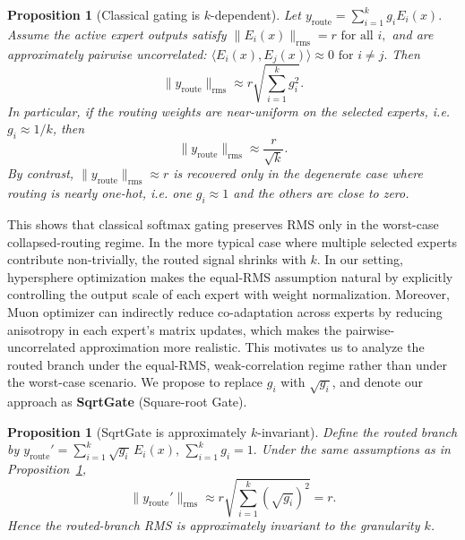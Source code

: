 \documentclass{article}
\newtheorem{proposition}[theorem]{Proposition}
\begin{document}
\begin{proposition}[Classical gating is $k$-dependent]
\label{prop:moe-classical-gating}
Let
$
y_{\mathrm{route}}=\sum_{i=1}^{k} g_i E_i(x).
$
Assume the active expert outputs satisfy
$
\|E_i(x)\|_{\mathrm{rms}} = r  \, \,\text{for all } i,
$
and are approximately pairwise uncorrelated:
$
\langle E_i(x), E_j(x)\rangle \approx 0 \,\, \text{for } i\neq j.
$
Then
\begin{equation}
\|y_{\mathrm{route}}\|_{\mathrm{rms}}
\approx
r \sqrt{\sum_{i=1}^{k} g_i^2}.
\end{equation}
In particular, if the routing weights are near-uniform on the selected experts, i.e. $g_i \approx 1/k$, then
\begin{equation}
\|y_{\mathrm{route}}\|_{\mathrm{rms}}
\approx
\frac{r}{\sqrt{k}}.
\end{equation}
By contrast, $\|y_{\mathrm{route}}\|_{\mathrm{rms}} \approx r$ is recovered only in the degenerate case where routing is nearly one-hot, i.e. one $g_i\approx 1$ and the others are close to zero.
\end{proposition}
This shows that classical softmax gating preserves RMS only in the worst-case collapsed-routing regime. In the more typical case where multiple selected experts contribute non-trivially, the routed signal shrinks with $k$. In our setting, hypersphere optimization makes the equal-RMS assumption natural by explicitly controlling the output scale of each expert with weight normalization. Moreover, Muon optimizer can indirectly reduce co-adaptation across experts by reducing anisotropy in each expert's matrix updates, which makes the pairwise-uncorrelated approximation more realistic. This motivates us to analyze the routed branch under the equal-RMS, weak-correlation regime rather than under the worst-case scenario. We propose to replace $g_i$ with $\sqrt{g_i}$, and denote our approach as \textbf{SqrtGate} (Square-root Gate).

\begin{proposition}[SqrtGate is approximately $k$-invariant]
\label{prop:moe-sqrt-gating}
Define the routed branch by
$
y_{\mathrm{route}}'
=
\sum_{i=1}^{k} \sqrt{g_i}\, E_i(x),
\, \sum_{i=1}^{k} g_i = 1.
$
Under the same assumptions as in Proposition~\ref{prop:moe-classical-gating},
\begin{equation}
\|y_{\mathrm{route}}'\|_{\mathrm{rms}}
\approx
r \sqrt{\sum_{i=1}^{k} (\sqrt{g_i})^2}
=
r.
\end{equation}
Hence the routed-branch RMS is approximately invariant to the granularity $k$.
\end{proposition}
\end{document}
